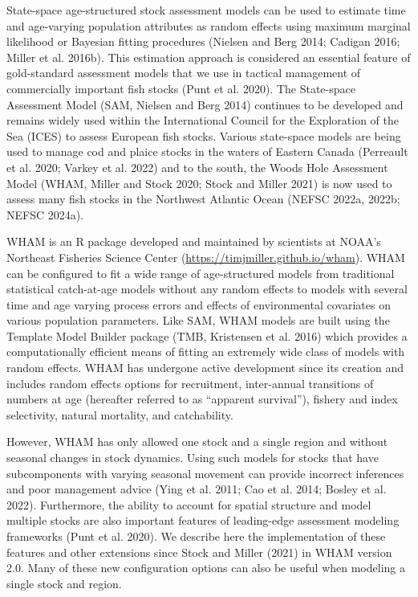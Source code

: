 \documentclass[
]{article}
\begin{document}
State-space age-structured stock assessment models can be used to estimate time and age-varying population attributes as random effects using maximum marginal likelihood or Bayesian fitting procedures (Nielsen and Berg 2014; Cadigan 2016; Miller et al. 2016b). This estimation approach is considered an essential feature of gold-standard assessment models that we use in tactical management of commercially important fish stocks (Punt et al. 2020). The State-space Assessment Model (SAM, Nielsen and Berg 2014) continues to be developed and remains widely used within the International Council for the Exploration of the Sea (ICES) to assess European fish stocks. Various state-space models are being used to manage cod and plaice stocks in the waters of Eastern Canada (Perreault et al. 2020; Varkey et al. 2022) and to the south, the Woods Hole Assessment Model (WHAM, Miller and Stock 2020; Stock and Miller 2021) is now used to assess many fish stocks in the Northwest Atlantic Ocean (NEFSC 2022a, 2022b; NEFSC 2024a).

WHAM is an R package developed and maintained by scientists at NOAA's Northeast Fisheries Science Center (\url{https://timjmiller.github.io/wham}). WHAM can be configured to fit a wide range of age-structured models from traditional statistical catch-at-age models without any random effects to models with several time and age varying process errors and effects of environmental covariates on various population parameters. Like SAM, WHAM models are built using the Template Model Builder package (TMB, Kristensen et al. 2016) which provides a computationally efficient means of fitting an extremely wide class of models with random effects. WHAM has undergone active development since its creation and includes random effects options for recruitment, inter-annual transitions of numbers at age (hereafter referred to as ``apparent survival''), fishery and index selectivity, natural mortality, and catchability.

However, WHAM has only allowed one stock and a single region and without seasonal changes in stock dynamics. Using such models for stocks that have subcomponents with varying seasonal movement can provide incorrect inferences and poor management advice (Ying et al. 2011; Cao et al. 2014; Bosley et al. 2022). Furthermore, the ability to account for spatial structure and model multiple stocks are also important features of leading-edge assessment modeling frameworks (Punt et al. 2020). We describe here the implementation of these features and other extensions since Stock and Miller (2021) in WHAM version 2.0. Many of these new configuration options can also be useful when modeling a single stock and region.
\end{document}
